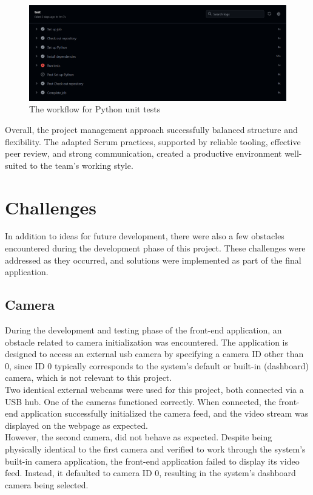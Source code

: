\begin{figure}[h!] \centering 
\includegraphics[width=0.75\linewidth]{figures/results/workflows/tests.png}\caption[Python tests workflow]{The workflow for Python unit tests}\label{fig:workflow-test} \end{figure}

Overall, the project management approach successfully balanced structure and flexibility. The adapted Scrum practices, supported by reliable tooling, effective peer review, and strong communication, created a productive environment well-suited to the team's working style. 

\section{Challenges}
In addition to ideas for future development, there were also a few obstacles encountered during the development phase of this project. These challenges were addressed as they occurred, and solutions were implemented as part of the final application. \\

\subsection{Camera}
During the development and testing phase of the front-end application, an obstacle related to camera initialization was encountered. The application is designed to access an external \gls{usb} camera by specifying a camera ID other than 0, since ID 0 typically corresponds to the system's default or built-in (dashboard) camera, which is not relevant to this project.\\

Two identical external webcams were used for this project, both connected via a USB hub. One of the cameras functioned correctly. When connected, the front-end application successfully initialized the camera feed, and the video stream was displayed on the webpage as expected.\\

However, the second camera, did not behave as expected. Despite being physically identical to the first camera and verified to work through the system's built-in camera application, the front-end application failed to display its video feed. Instead, it defaulted to camera ID 0, resulting in the system's dashboard camera being selected.\\

